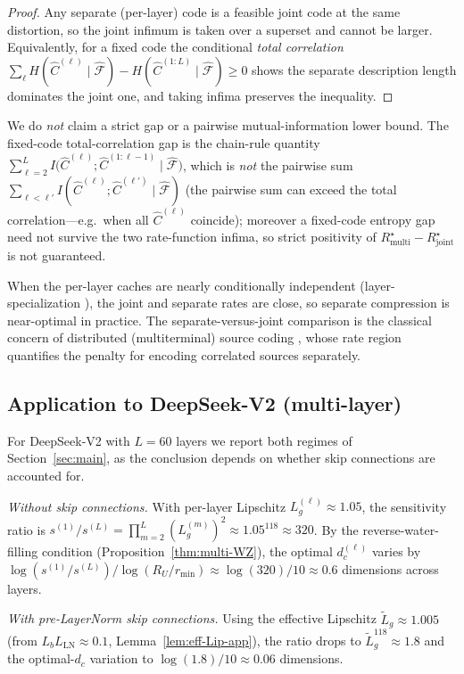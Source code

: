 \documentclass[11pt]{article}
\newcommand{\F}{\mathcal{F}}
\newcommand{\Fhat}{\hat{\F}}
\newcommand{\Chat}{\hat{C}}
\theoremstyle{plain}
\theoremstyle{definition}
\theoremstyle{remark}
\begin{document}
\begin{proof}
Any separate (per-layer) code is a feasible joint code at the same
distortion, so the joint infimum is taken over a superset and cannot
be larger. Equivalently, for a fixed code the conditional
\emph{total correlation}
$\sum_\ell H(\Chat^{(\ell)}\mid\Fhat)-H(\Chat^{(1:L)}\mid\Fhat)\ge0$
shows the separate description length dominates the joint one, and
taking infima preserves the inequality.
\end{proof}

We do \emph{not} claim a strict gap or a pairwise mutual-information
lower bound. The fixed-code total-correlation gap is the chain-rule
quantity $\sum_{\ell=2}^{L} I\bigl(\Chat^{(\ell)};\Chat^{(1:\ell-1)}\mid\Fhat\bigr)$,
which is \emph{not} the pairwise sum
$\sum_{\ell<\ell'} I(\Chat^{(\ell)};\Chat^{(\ell')}\mid\Fhat)$
(the pairwise sum can exceed the total correlation---e.g.\ when all
$\Chat^{(\ell)}$ coincide); moreover a fixed-code entropy gap need not
survive the two rate-function infima, so strict positivity of
$R^\star_{\mathrm{multi}}-R^\star_{\mathrm{joint}}$ is not guaranteed.

When the per-layer caches are nearly conditionally independent
(layer-specialization \citep{geva2020transformer}), the joint and
separate rates are close, so separate compression is near-optimal in
practice. The separate-versus-joint comparison is the classical
concern of distributed (multiterminal) source coding
\citep{elgamal2011network}, whose rate region quantifies the penalty
for encoding correlated sources separately.

\subsection{Application to DeepSeek-V2 (multi-layer)}

For DeepSeek-V2 with $L = 60$ layers we report both regimes of
Section~\ref{sec:main}, as the conclusion depends on whether skip
connections are accounted for.

\emph{Without skip connections.} With per-layer Lipschitz
$L_g^{(\ell)} \approx 1.05$, the sensitivity ratio is
$s^{(1)}/s^{(L)} = \prod_{m=2}^L (L_g^{(m)})^2 \approx 1.05^{118}
\approx 320$. By the reverse-water-filling condition
(Proposition~\ref{thm:multi-WZ}), the optimal $d_c^{(\ell)}$ varies by
$\log(s^{(1)}/s^{(L)})/\log(R_U/r_{\min}) \approx \log(320)/10
\approx 0.6$ dimensions across layers.

\emph{With pre-LayerNorm skip connections.} Using the effective
Lipschitz $\tilde L_g \approx 1.005$ (from
$L_b L_{\mathrm{LN}} \approx 0.1$, Lemma~\ref{lem:eff-Lip-app}),
the ratio drops to $\tilde L_g^{118} \approx 1.8$ and the
optimal-$d_c$ variation to $\log(1.8)/10 \approx 0.06$ dimensions.
\end{document}
